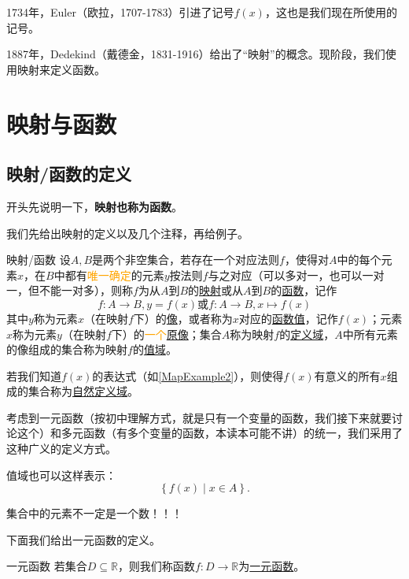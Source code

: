 \documentclass[lang=cn,math=cm,chinesefont=nofont,11pt,scheme=chinese,onecol]{elegantbook}
\begin{document}
1734年，Euler（欧拉，1707-1783）引进了记号$f(x)$，这也是我们现在所使用的记号。

1887年，Dedekind（戴德金，1831-1916）给出了“映射”的概念。现阶段，我们使用映射来定义函数。

\section{映射与函数}

\subsection{映射/函数的定义}

开头先说明一下，\textbf{映射也称为函数}。

我们先给出映射的定义以及几个注释，再给例子。

\begin{definition}{映射/函数}
  设$A,B$是两个非空集合，若存在一个对应法则$f$，使得对$A$中的每个元素$x$，在$B$中都有\textcolor{orange}{唯一确定}的元素$y$按法则$f$与之对应（可以多对一，也可以一对一，但不能一对多），则称$f$为从$A$到$B$的\underline{映射}或从$A$到$B$的\underline{函数}，记作$$f:A\rightarrow B,y=f(x)\text{或}f:A\rightarrow B,x\mapsto f(x)$$其中$y$称为元素$x$（在映射$f$下）的\underline{像}，或者称为$x$对应的\underline{函数值}，记作$f(x)$；元素$x$称为元素$y$（在映射$f$下）的\textcolor{orange}{一个}\underline{原像}；集合$A$称为映射$f$的\underline{定义域}，$A$中所有元素的像组成的集合称为映射$f$的\underline{值域}。

  若我们知道$f(x)$的表达式（如\ref{MapExample2}），则使得$f(x)$有意义的所有$x$组成的集合称为\underline{自然定义域}。
\end{definition}

\begin{remark}
  考虑到一元函数（按初中理解方式，就是只有一个变量的函数，我们接下来就要讨论这个）和多元函数（有多个变量的函数，本读本可能不讲）的统一，我们采用了这种广义的定义方式。
\end{remark}

\begin{remark}
  值域也可以这样表示：$$\left\{f(x)\mid x\in A\right\}.$$
\end{remark}

\begin{remark}
  集合中的元素不一定是一个数！！！
\end{remark}

下面我们给出一元函数的定义。

\begin{definition}{一元函数}
  若集合$D\subseteq \mathbb{R}$，则我们称函数$f:D\rightarrow\mathbb{R}$为\underline{一元函数}。
\end{definition}
\end{document}

